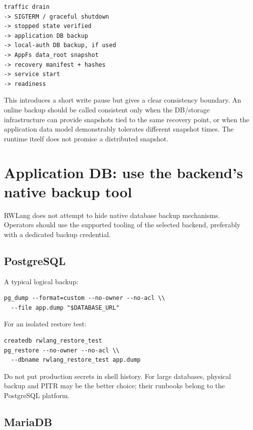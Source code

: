\begin{lstlisting}
traffic drain
-> SIGTERM / graceful shutdown
-> stopped state verified
-> application DB backup
-> local-auth DB backup, if used
-> AppFs data_root snapshot
-> recovery manifest + hashes
-> service start
-> readiness
\end{lstlisting}

This introduces a short write pause but gives a clear consistency boundary. An online backup should be called consistent only when the DB/storage infrastructure can provide snapshots tied to the same recovery point, or when the application data model demonstrably tolerates different snapshot times. The runtime itself does not promise a distributed snapshot.

\section{Application DB: use the backend's native backup tool}

RWLang does not attempt to hide native database backup mechanisms. Operators should use the supported tooling of the selected backend, preferably with a dedicated backup credential.

\subsection*{PostgreSQL}

A typical logical backup:

\begin{lstlisting}
pg_dump --format=custom --no-owner --no-acl \\
  --file app.dump "$DATABASE_URL"
\end{lstlisting}

For an isolated restore test:

\begin{lstlisting}
createdb rwlang_restore_test
pg_restore --no-owner --no-acl \\
  --dbname rwlang_restore_test app.dump
\end{lstlisting}

Do not put production secrets in shell history. For large databases, physical backup and PITR may be the better choice; their runbooks belong to the PostgreSQL platform.

\subsection*{MariaDB}

